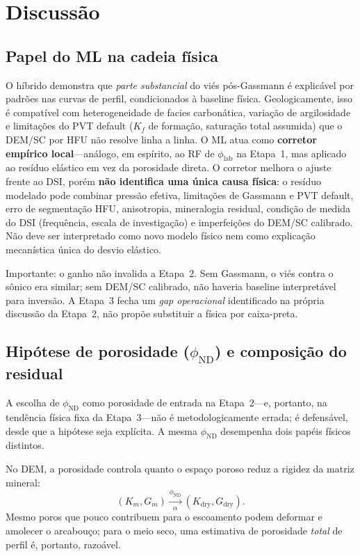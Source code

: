 \documentclass[11pt,a4paper]{article}
\numberwithin{equation}{section}
\newcommand{\philab}{\ensuremath{\phi_{\mathrm{lab}}}}
\newcommand{\phiND}{\ensuremath{\phi_{\mathrm{ND}}}}
\begin{document}
\section{Discussão}
\label{sec:discussao}

\subsection{Papel do ML na cadeia física}

O híbrido demonstra que \emph{parte substancial} do viés pós-Gassmann
é explicável por padrões nas curvas de perfil, condicionados à baseline
física.
Geologicamente, isso é compatível com heterogeneidade de facies carbonática,
variação de argilosidade e limitações do PVT default ($K_f$ de
formação, saturação total assumida) que o DEM/SC por HFU não resolve
linha a linha.
O ML atua como \textbf{corretor empírico local}---análogo, em espírito, ao
RF de \philab{} na Etapa~1, mas aplicado ao resíduo elástico em vez da
porosidade direta.
O corretor melhora o ajuste frente ao DSI, porém \textbf{não identifica uma
única causa física}: o resíduo modelado pode combinar pressão efetiva,
limitações de Gassmann e PVT default, erro de segmentação HFU,
anisotropia, mineralogia residual, condição de medida do DSI (frequência,
escala de investigação) e imperfeições do DEM/SC calibrado.
Não deve ser interpretado como novo modelo físico nem como explicação
mecanística única do desvio elástico.

Importante: o ganho não invalida a Etapa~2.
Sem Gassmann, o viés contra o sônico era similar; sem DEM/SC calibrado, não
haveria baseline interpretável para inversão.
A Etapa~3 fecha um \emph{gap operacional} identificado na própria discussão
da Etapa~2, não propõe substituir a física por caixa-preta.

\subsection{Hipótese de porosidade (\phiND{}) e composição do residual}
\label{sec:phi_nd_hypothesis}

A escolha de \phiND{} como porosidade de entrada na Etapa~2---e, portanto,
na tendência física fixa da Etapa~3---não é metodologicamente errada; é
defensável, desde que a hipótese seja explícita.
A mesma \phiND{} desempenha dois papéis físicos distintos.

No DEM, a porosidade controla quanto o espaço poroso reduz a rigidez da
matriz mineral:
\begin{equation}
  (K_m,G_m)
  \xrightarrow[\alpha]{\phiND{}}
  (K_{\mathrm{dry}},G_{\mathrm{dry}}).
\end{equation}
Mesmo poros que pouco contribuem para o escoamento podem deformar e
amolecer o arcabouço; para o meio seco, uma estimativa de porosidade
\emph{total} de perfil é, portanto, razoável.
\end{document}
